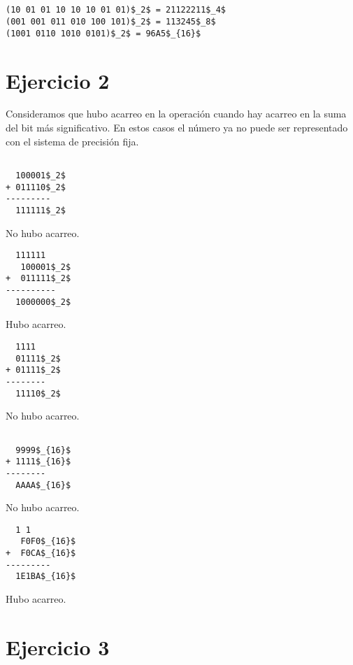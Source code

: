 \subsection{}

\begin{lstlisting}
(10 01 01 10 10 10 01 01)$_2$ = 21122211$_4$
(001 001 011 010 100 101)$_2$ = 113245$_8$
(1001 0110 1010 0101)$_2$ = 96A5$_{16}$
\end{lstlisting}

\section{Ejercicio 2}

Consideramos que hubo acarreo en la operación cuando hay acarreo en la suma del bit más significativo. En estos casos el número ya no puede ser representado con el sistema de precisión fija.

\begin{multicols}{5}

\begin{lstlisting}

  100001$_2$
+ 011110$_2$
---------
  111111$_2$
\end{lstlisting}
No hubo acarreo.

\columnbreak

\begin{lstlisting}
  111111
   100001$_2$
+  011111$_2$
----------
  1000000$_2$
\end{lstlisting}
Hubo acarreo.

\columnbreak

\begin{lstlisting}
  1111
  01111$_2$
+ 01111$_2$
--------
  11110$_2$
\end{lstlisting}
No hubo acarreo.

\columnbreak

\begin{lstlisting}

  9999$_{16}$
+ 1111$_{16}$
--------
  AAAA$_{16}$
\end{lstlisting}
No hubo acarreo.

\columnbreak

\begin{lstlisting}
  1 1
   F0F0$_{16}$
+  F0CA$_{16}$
---------
  1E1BA$_{16}$
\end{lstlisting}
Hubo acarreo.

\end{multicols}

\section{Ejercicio 3}

